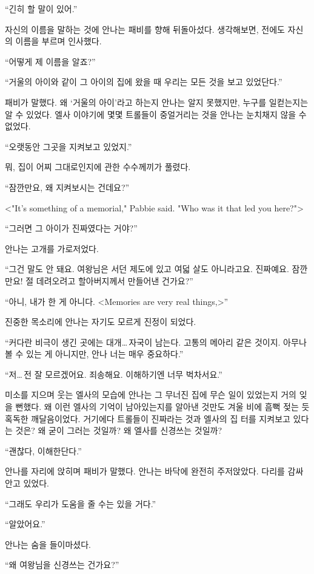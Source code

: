 ``긴히 할 말이 있어.''

자신의 이름을 말하는 것에 안나는 패비를 향해 뒤돌아섰다. 생각해보면, 전에도 자신의 이름을 부르며 인사했다.

``어떻게 제 이름을 알죠?''

``거울의 아이와 같이 그 아이의 집에 왔을 때 우리는 모든 것을 보고 있었단다.''

패비가 말했다. 왜 `거울의 아이'라고 하는지 안나는 알지 못했지만, 누구를 일컫는지는 알 수 있었다. 엘사 이야기에 몇몇 트롤들이 중얼거리는 것을 안나는 눈치채지 않을 수 없었다.

``오랫동안 그곳을 지켜보고 있었지.''

뭐, 집이 어찌 그대로인지에 관한 수수께끼가 풀렸다.

``잠깐만요, 왜 지켜보시는 건데요?''

<"It's something of a memorial," Pabbie said. "Who was it that led you here?">

``그러면 그 아이가 진짜였다는 거야?''

안나는 고개를 가로저었다.

``그건 말도 안 돼요. 여왕님은 서던 제도에 있고 여덟 살도 아니라고요. 진짜예요. 잠깐만요! 절 데려오려고 할아버지께서 만들어낸 건가요?''

``아니, 내가 한 게 아니다. <Memories are very real things,>''

진중한 목소리에 안나는 자기도 모르게 진정이 되었다.

``커다란 비극이 생긴 곳에는 대개\ldots\,자국이 남는다. 고통의 메아리 같은 것이지. 아무나 볼 수 있는 게 아니지만, 안나 너는 매우 중요하다.''

``저\ldots\,전 잘 모르겠어요. 죄송해요. 이해하기엔 너무 벅차서요.''

미소를 지으며 웃는 엘사의 모습에 안나는 그 무너진 집에 무슨 일이 있었는지 거의 잊을 뻔했다. 왜 이런 엘사의 기억이 남아있는지를 알아낸 것만도 겨울 비에 흠뻑 젖는 듯 혹독한 깨달음이었다. 거기에다 트롤들이 진짜라는 것과 엘사의 집 터를 지켜보고 있다는 것은? 왜 굳이 그러는 것일까? 왜 엘사를 신경쓰는 것일까?

``괜찮다, 이해한단다.''

안나를 자리에 앉히며 패비가 말했다. 안나는 바닥에 완전히 주저앉았다. 다리를 감싸 안고 있었다.

``그래도 우리가 도움을 줄 수는 있을 거다.''

``알았어요.''

안나는 숨을 들이마셨다.

``왜 여왕님을 신경쓰는 건가요?''

